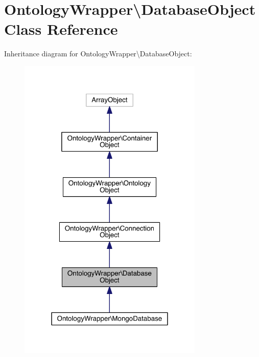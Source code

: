 \hypertarget{class_ontology_wrapper_1_1_database_object}{\section{Ontology\-Wrapper\textbackslash{}Database\-Object Class Reference}
\label{class_ontology_wrapper_1_1_database_object}
}


Inheritance diagram for Ontology\-Wrapper\textbackslash{}Database\-Object\-:
\nopagebreak
\begin{figure}[H]
\begin{center}
\leavevmode
\includegraphics[width=250pt]{class_ontology_wrapper_1_1_database_object__inherit__graph}
\end{center}
\end{figure}



